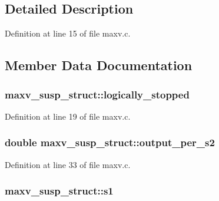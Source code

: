\subsection{Detailed Description}


Definition at line 15 of file maxv.\+c.



\subsection{Member Data Documentation}
\subsubsection[{\texorpdfstring{logically\+\_\+stopped}{logically_stopped}}]{ maxv\+\_\+susp\+\_\+struct\+::logically\+\_\+stopped}\hypertarget{structmaxv__susp__struct_a89fb67e00016993f6a4636ea2fb1af4e}{}\label{structmaxv__susp__struct_a89fb67e00016993f6a4636ea2fb1af4e}


Definition at line 19 of file maxv.\+c.

\subsubsection[{\texorpdfstring{output\+\_\+per\+\_\+s2}{output_per_s2}}]{\setlength{\rightskip}{0pt plus 5cm}double maxv\+\_\+susp\+\_\+struct\+::output\+\_\+per\+\_\+s2}\hypertarget{structmaxv__susp__struct_a8008c9374d59f9cff3a018bbf97ddbe7}{}\label{structmaxv__susp__struct_a8008c9374d59f9cff3a018bbf97ddbe7}


Definition at line 33 of file maxv.\+c.

\subsubsection[{\texorpdfstring{s1}{s1}}]{ maxv\+\_\+susp\+\_\+struct\+::s1}\hypertarget{structmaxv__susp__struct_aebc4b57d87d27bd0b93b899d5b172e1a}{}\label{structmaxv__susp__struct_aebc4b57d87d27bd0b93b899d5b172e1a}


